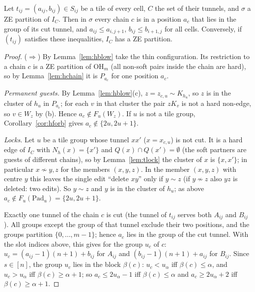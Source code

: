 \begin{proposition}\label{prop:hTR}
Let $t_{ij}=(a_{ij},b_{ij})\in S_{ij}$ be a tile of every cell, $C$ the set of their tunnels, and $\sigma$ a ZE partition of $I_C$. Then in $\sigma$ every chain $c$ is in a position $a_c$ that lies in the group of its cut tunnel, and $a_{ij}\le a_{i,j+1}$, $b_{ij}\le b_{i+1,j}$ for all cells. Conversely, if $(t_{ij})$ satisfies these inequalities, $I_C$ has a ZE partition.
\end{proposition}
\begin{proof}
($\Rightarrow$) By Lemma~\ref{lem:hblow} take the thin configuration. Its restriction to a chain $c$ is a ZE partition of $\mathrm{OH}_m$ (all non-soft pairs inside the chain are hard), so by Lemma~\ref{lem:hchain} it is $P_{a_c}$ for one position $a_c$.

\emph{Permanent guests.} By Lemma~\ref{lem:hblow}(c), $z=z_{c,u}\sim K_{h_u}$, so $z$ is in the cluster of $h_u$ in $P_{a_c}$; for each $v$ in that cluster the pair $zK_v$ is not a hard non-edge, so $v\in W_z$ by (b). Hence $a_c\notin F_u(W_z)$. If $u$ is not a tile group, Corollary~\ref{cor:hforb} gives $a_c\notin\{2u,2u+1\}$.

\emph{Locks.} Let $u$ be a tile group whose tunnel $xx'$ ($x=x_{c,u}$) is not cut. It is a hard edge of $I_C$ with $N_h(x)=\{x'\}$ and $Q(x)\cap Q(x')=\emptyset$ (the soft partners are guests of different chains), so by Lemma~\ref{lem:tlock} the cluster of $x$ is $\{x,x'\}$; in particular $x\not\sim y,z$ for the members $(x,y,z)$. In the member $(x,y,z)$ with centre $y$ this leaves the single edit ``delete $xy$'' only if $y\sim z$ (if $y\not\sim z$ also $yz$ is deleted: two edits). So $y\sim z$ and $y$ is in the cluster of $h_u$; as above $a_c\notin F_u(\mathrm{Pad}_u)=\{2u,2u+1\}$.

Exactly one tunnel of the chain $c$ is cut (the tunnel of $t_{ij}$ serves both $A_{ij}$ and $B_{ij}$). All groups except the group of that tunnel exclude their two positions, and the groups partition $\{0,\dots,m-1\}$; hence $a_c$ lies in the group of the cut tunnel. With the slot indices above, this gives for the group $u_c$ of $c$: $u_c=(a_{ij}-1)(n+1)+b_{ij}$ for $A_{ij}$ and $(b_{ij}-1)(n+1)+a_{ij}$ for $B_{ij}$. Since $s\in[n]$, the group $u_c$ lies in the block $\beta(c)$: $u_c<u_\alpha$ iff $\beta(c)\le\alpha$, and $u_c>u_\alpha$ iff $\beta(c)\ge\alpha+1$; so $a_c\le2u_\alpha-1$ iff $\beta(c)\le\alpha$ and $a_c\ge2u_\alpha+2$ iff $\beta(c)\ge\alpha+1$.


\end{proof}
